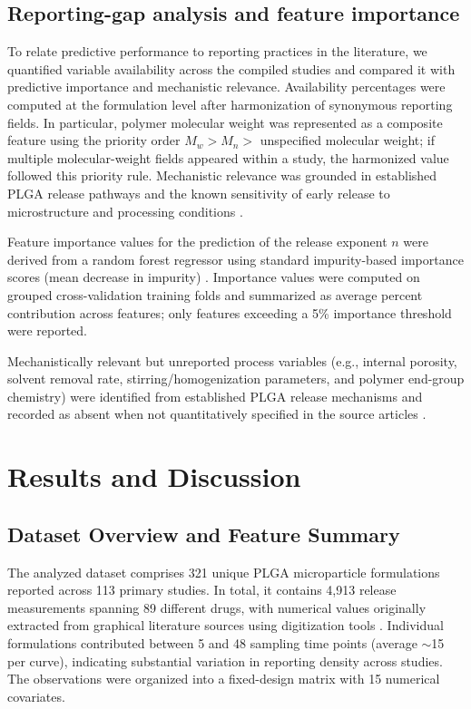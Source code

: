 \documentclass[preprint,12pt,authoryear]{elsarticle}
\begin{document}
\subsection{Reporting-gap analysis and feature importance}
To relate predictive performance to reporting practices in the literature, we quantified variable availability across the compiled studies and compared it with predictive importance and mechanistic relevance. Availability percentages were computed at the formulation level after harmonization of synonymous reporting fields. In particular, polymer molecular weight was represented as a composite feature using the priority order $M_w > M_n >$ unspecified molecular weight; if multiple molecular-weight fields appeared within a study, the harmonized value followed this priority rule. Mechanistic relevance was grounded in established PLGA release pathways and the known sensitivity of early release to microstructure and processing conditions \citep{Fredenberg2011, FreibergZhu2004, Jain2000, Yoo2020Burst, KloseSiepmann2006Porosity}.

Feature importance values for the prediction of the release exponent $n$ were derived from a random forest regressor using standard impurity-based importance scores (mean decrease in impurity) \citep{Breiman2001RF}. Importance values were computed on grouped cross-validation training folds and summarized as average percent contribution across features; only features exceeding a 5\% importance threshold were reported.

Mechanistically relevant but unreported process variables (e.g., internal porosity, solvent removal rate, stirring/homogenization parameters, and polymer end-group chemistry) were identified from established PLGA release mechanisms and recorded as absent when not quantitatively specified in the source articles \citep{Fredenberg2011, FreibergZhu2004, Jain2000, KloseSiepmann2006Porosity, Yoo2020Burst}.

\section{Results and Discussion}

\subsection{Dataset Overview and Feature Summary}

The analyzed dataset comprises 321 unique PLGA microparticle formulations reported across 113 primary studies. In total, it contains 4,913 release measurements spanning 89 different drugs, with numerical values originally extracted from graphical literature sources using digitization tools \citep{Rohatgi2022WebPlotDigitizer, Drevon2017WPD}. Individual formulations contributed between 5 and 48 sampling time points (average $\sim$15 per curve), indicating substantial variation in reporting density across studies. The observations were organized into a fixed-design matrix with 15 numerical covariates.
\end{document}
